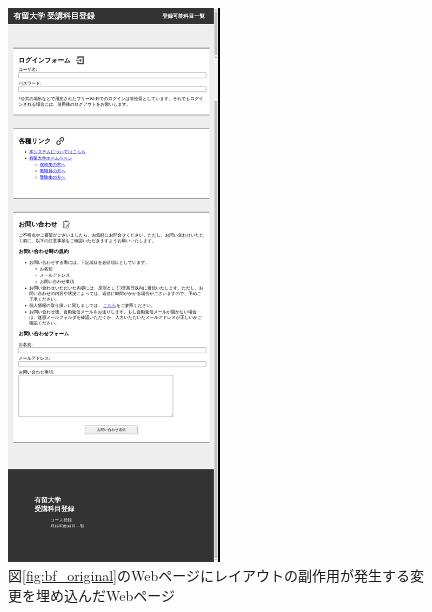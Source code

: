 \begin{figure}[htbp]
    \centering
    \includegraphics[width=0.5\textwidth]{image/5/original_png/af_original.png}
    \caption{図\ref{fig:bf_original}のWebページにレイアウトの副作用が発生する変更を埋め込んだWebページ}
    \label{fig:af_original}
\end{figure}

